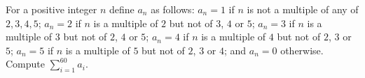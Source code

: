 For a positive integer $n$ define $a_n$ as follows: $a_n=1$ if $n$ is not a multiple of any of $2,3,4,5$; $a_n=2$ if $n$ is a multiple of $2$ but not of $3$, $4$ or $5$; $a_n=3$ if $n$ is a multiple of $3$ but not of $2$, $4$ or $5$; $a_n=4$ if $n$ is a multiple of $4$ but not of $2$, $3$ or $5$; $a_n=5$ if $n$ is a multiple of $5$ but not of $2$, $3$ or $4$; and $a_n=0$ otherwise. Compute $\displaystyle\sum_{i=1}^{60}a_i$.
